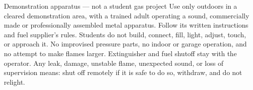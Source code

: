



\begin{teloshazard}{Demonstration apparatus --- not a student gas project}
Use only outdoors in a cleared demonstration area, with a trained adult operating
a sound, commercially made or professionally assembled metal apparatus. Follow
its written instructions and fuel supplier's rules. Students do not build,
connect, fill, light, adjust, touch, or approach it. No improvised pressure
parts, no indoor or garage operation, and no attempt to make flames larger.
Extinguisher and fuel shutoff stay with the operator. Any leak, damage, unstable
flame, unexpected sound, or loss of supervision means: shut off remotely if it
is safe to do so, withdraw, and do not relight.
\end{teloshazard}

